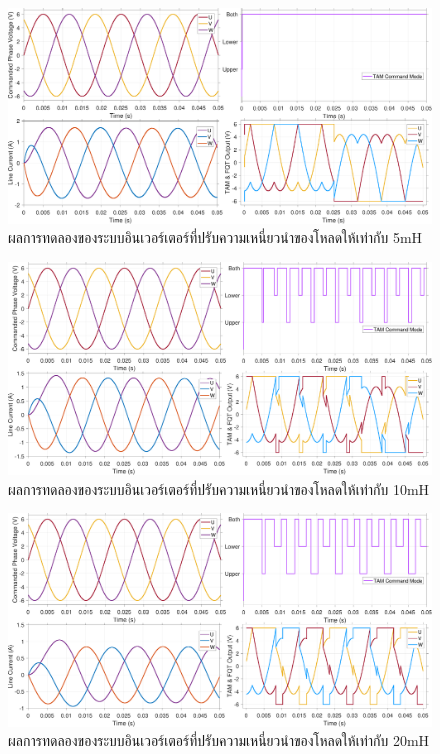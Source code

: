 \documentclass[11pt,a4paper]{article}
\begin{document}
\begin{figure}[H]
    \centering
    \includegraphics[width=\textwidth]{5mH.pdf}
    \caption{ผลการทดลองของระบบอินเวอร์เตอร์ที่ปรับความเหนี่ยวนำของโหลดให้เท่ากับ 5mH}
    \label{5mH}
\end{figure}

\begin{figure}[H]
    \centering
    \includegraphics[width=\textwidth]{10mH.pdf}
    \caption{ผลการทดลองของระบบอินเวอร์เตอร์ที่ปรับความเหนี่ยวนำของโหลดให้เท่ากับ 10mH}
    \label{10mH}
\end{figure}

\begin{figure}[H]
    \centering
    \includegraphics[width=\textwidth]{20mH.pdf}
    \caption{ผลการทดลองของระบบอินเวอร์เตอร์ที่ปรับความเหนี่ยวนำของโหลดให้เท่ากับ 20mH}
    \label{20mH}
\end{figure}
\end{document}
